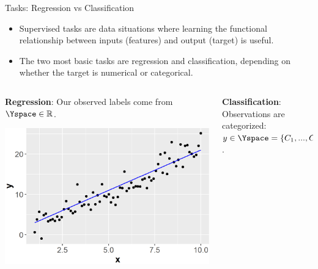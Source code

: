 \begin{vbframe}{Tasks: Regression vs Classification}

\begin{itemize}
    \item Supervised tasks are data situations where learning the functional
        relationship between inputs (features) and output (target) is
        useful.
    
    \item The two most basic tasks are 
        regression and classification, depending on whether the 
        target is numerical or categorical.
\end{itemize}  

\lz

\begin{columns}    
\begin{column}{0.5\textwidth} 
\textbf{Regression}: Our observed labels come from $\Yspace \in \mathbb{R}$.

  \begin{center}
    \includegraphics[width=\textwidth]{figure/ml-basics-supervised-regression-task.png} 
  \end{center}
\end{column}    

\begin{column}{0.5\textwidth} 
\textbf{Classification}: Observations are categorized: $y \in \Yspace = \{C_1,...,C_g\}$.
  

\end{column}
\end{columns}
\end{vbframe}
